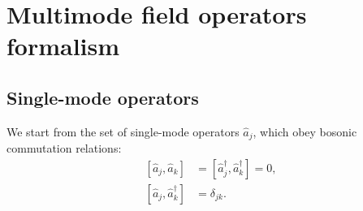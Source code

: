 \chapter{Multimode field operators formalism}
\label{cha:appendix:multimode-formalism}


\section{Single-mode operators}

We start from the set of single-mode operators $\hat{a}_j$, which obey bosonic commutation relations:
\begin{equation}
\label{eqn:multimode-formalism:single-mode-commutators}
\begin{split}
	[ \hat{a}_j, \hat{a}_k ] & = [ \hat{a}_j^\dagger, \hat{a}_k^\dagger ] = 0, \\
	[ \hat{a}_j, \hat{a}_k^\dagger ] & = \delta_{jk}.
\end{split}
\end{equation}

